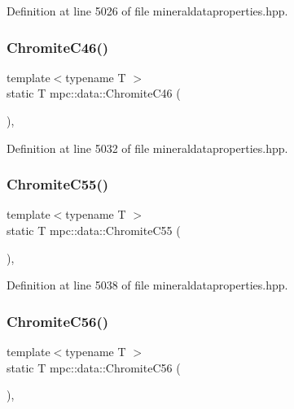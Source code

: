 Definition at line 5026 of file mineraldataproperties.\+hpp.

\mbox{\label{namespacempc_1_1data_a33a011775e2eba3965f0bd0a1ac40bff}} 
\subsubsection{\texorpdfstring{Chromite\+C46()}{ChromiteC46()}}
{\footnotesize\ttfamily template$<$typename T $>$ \\
static T mpc\+::data\+::\+Chromite\+C46 (\begin{DoxyParamCaption}{ }\end{DoxyParamCaption})\hspace{0.3cm}{\ttfamily [inline]}, {\ttfamily [static]}}



Definition at line 5032 of file mineraldataproperties.\+hpp.

\mbox{\label{namespacempc_1_1data_a355922ba7af624c921fad5d805545bac}} 
\subsubsection{\texorpdfstring{Chromite\+C55()}{ChromiteC55()}}
{\footnotesize\ttfamily template$<$typename T $>$ \\
static T mpc\+::data\+::\+Chromite\+C55 (\begin{DoxyParamCaption}{ }\end{DoxyParamCaption})\hspace{0.3cm}{\ttfamily [inline]}, {\ttfamily [static]}}



Definition at line 5038 of file mineraldataproperties.\+hpp.

\mbox{\label{namespacempc_1_1data_ae19342af78f328c1fa5a25eb8d8d2434}} 
\subsubsection{\texorpdfstring{Chromite\+C56()}{ChromiteC56()}}
{\footnotesize\ttfamily template$<$typename T $>$ \\
static T mpc\+::data\+::\+Chromite\+C56 (\begin{DoxyParamCaption}{ }\end{DoxyParamCaption})\hspace{0.3cm}{\ttfamily [inline]}, {\ttfamily [static]}}



